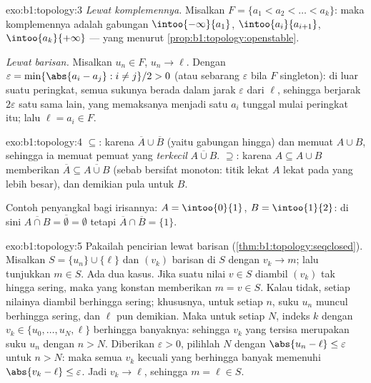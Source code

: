 \begin{solution}{exo:b1:topology:3}
\emph{Lewat komplemennya.} Misalkan $F = \{a_1 < a_2 < \dots < a_k\}$: maka komplemennya
adalah gabungan   $\intoo{-\infty}{a_1}$,
$\intoo{a_i}{a_{i+1}}$, $\intoo{a_k}{+\infty}$ --- yang  menurut
\cref{prop:b1:topology:openstable}.

\emph{Lewat barisan.} Misalkan $u_n \in F$, $u_n \to \ell$. Dengan $\varepsilon
= \min\{\abs{a_i - a_j} : i \neq j\}/2 > 0$ (atau sebarang $\varepsilon$ bila
$F$ singleton): di luar suatu peringkat, semua sukunya berada dalam jarak
$\varepsilon$ dari $\ell$, sehingga berjarak $2\varepsilon$ satu sama lain,
yang memaksanya menjadi satu $a_i$ tunggal mulai peringkat itu; lalu
$\ell = a_i \in F$.
\end{solution}

\begin{solution}{exo:b1:topology:4}
$\subseteq$: karena $\overline A \cup \overline B$  (yaitu gabungan hingga)
dan memuat $A \cup B$, sehingga ia memuat pemuat 
yang \emph{terkecil} $\overline{A \cup B}$. $\supseteq$: karena $A \subseteq A \cup B$
memberikan $\overline A \subseteq \overline{A \cup B}$ (sebab  bersifat
monoton: titik lekat $A$ lekat pada  yang lebih besar), dan
demikian pula untuk $B$.

Contoh penyangkal bagi irisannya: $A = \intoo{0}{1}$, $B =
\intoo{1}{2}$: di sini $\overline{A \cap B} = \overline\emptyset = \emptyset$
tetapi $\overline A \cap \overline B = \{1\}$.
\end{solution}

\begin{solution}{exo:b1:topology:5}
Pakailah pencirian lewat barisan
(\cref{thm:b1:topology:seqclosed}). Misalkan $S = \{u_n\} \cup \{\ell\}$
dan $(v_k)$ barisan di $S$ dengan $v_k \to m$; lalu tunjukkan $m \in S$. Ada dua
kasus. Jika suatu nilai $v \in S$ diambil $(v_k)$ tak hingga sering,
maka  yang konstan memberikan $m = v \in S$. Kalau tidak, setiap
nilainya diambil berhingga sering; khususnya, untuk setiap $n$, suku
$u_n$ muncul berhingga sering, dan $\ell$ pun demikian. Maka untuk setiap $N$,
indeks $k$ dengan $v_k \in \{u_0, \dots, u_N, \ell\}$ berhingga
banyaknya: sehingga $v_k$ yang tersisa merupakan suku $u_n$ dengan $n > N$. Diberikan
$\varepsilon > 0$, pilihlah $N$ dengan $\abs{u_n - \ell} \leq
\varepsilon$ untuk $n > N$: maka semua $v_k$ kecuali yang berhingga banyak memenuhi
$\abs{v_k - \ell} \leq \varepsilon$. Jadi $v_k \to \ell$, sehingga $m =
\ell \in S$.
\end{solution}

